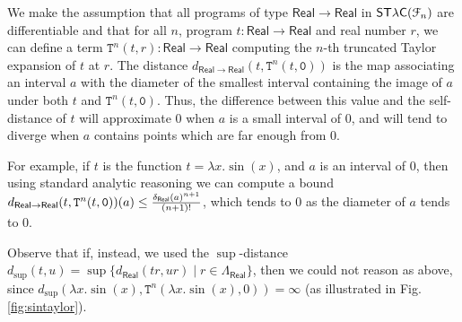\begin{example}

We make the assumption that all programs of type $\mathsf{Real}\to\mathsf{Real}$ in $\mathsf{ST\lambda C}(\mathcal F_{n})$ are differentiable and that for all $n$, program $t:\mathsf{Real}\to\mathsf{Real}$ and real number $r$, we can define a term 
$\mathtt T^{n}( t, r):\mathsf{Real}\to\mathsf{Real}$ computing the $n$-th truncated Taylor expansion of $t$ at $r$. 
The distance 
$d_{\mathsf{Real}\to\mathsf{Real}}(t, \mathtt T^{n}( t,\mathtt 0 ))$ is the map associating an interval $a$ with the diameter of the smallest interval containing the image of $a$ under both $t$ and $\mathtt T^{n}( t,\mathtt 0 )$. 
Thus, the difference between this value and the self-distance of $t$ will approximate 0 when $a$ is a small interval of $0$, and will tend to diverge when $a$ contains points which are far enough from 0. 

For example, if $t$ is the function $t=\lambda x.\sin(x)$, and $a$ is an interval of $0$, then using standard analytic reasoning we can compute a bound
$d_{\mathsf{Real}\to \mathsf{Real}}(t, \mathtt T^{n}( t,\mathtt 0 ))(a  )\leq \frac{\delta_{\mathsf{Real}}(a)^{n+1}}{(n+1)!} $, which tends to $0$ as the diameter of $a$ tends to $0$.

Observe that if, instead, we used the $\sup$-distance $d_{\sup}(t,u)= \sup\{d_{\mathsf{Real}}(tr, ur)\mid r\in \Lambda_{\mathsf{Real}}\}$, then we could not reason as above, since  
$d_{\sup}(\lambda x.\sin(x), \mathtt T^{n} ( \lambda x.\sin(x),0))=\infty$ (as illustrated in Fig. \ref{fig:sintaylor}).  

  
\end{example}

